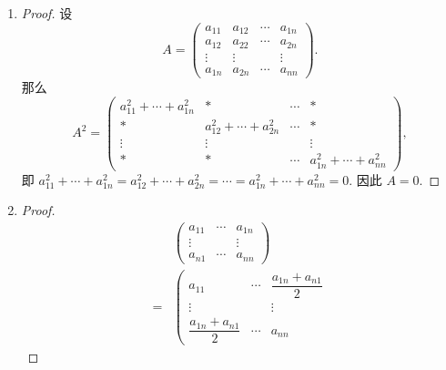\documentclass[a4paper, 11pt]{ctexart}
\begin{document}
\begin{enumerate}
    \item %
        \begin{proof}
            设
            \[
                A =
                \left(
                    \begin{array}{cccc}
                        a_{11} & a_{12} & \cdots & a_{1n} \\
                        a_{12} & a_{22} & \cdots & a_{2n} \\
                        \vdots & \vdots &  & \vdots \\
                        a_{1n} & a_{2n} & \cdots & a_{nn}
                    \end{array}
                \right).    
            \]
            那么
            \[
                A^2 =
                \left(
                    \begin{array}{cccc}
                        a_{11}^2 + \cdots + a_{1n}^2 & * & \cdots & * \\
                        * & a_{12}^2 + \cdots + a_{2n}^2 & \cdots & * \\
                        \vdots & \vdots &  & \vdots \\
                        * & * & \cdots & a_{1n}^2 + \cdots + a_{nn}^2
                    \end{array}
                \right),
            \]
            即 $a_{11}^2 + \cdots + a_{1n}^2 = a_{12}^2 + \cdots + a_{2n}^2 = \cdots = a_{1n}^2 + \cdots + a_{nn}^2 = 0$. 因此 $A = 0$.
        \end{proof}
    \item %
        \begin{proof}
            \begin{align*}
                & \left(
                    \begin{array}{cccc}
                        a_{11} & \cdots & a_{1n} \\
                        \vdots &  & \vdots \\
                        a_{n1} & \cdots & a_{nn}
                    \end{array}
                \right) \\
                ={} &
                \left(
                    \begin{array}{cccc}
                        a_{11} & \cdots & \dfrac{a_{1n}+a_{n1}}{2} \\
                        \vdots &  & \vdots \\
                        \dfrac{a_{1n}+a_{n1}}{2} & \cdots & a_{nn}

\end{array}
\end{align*}
\end{proof}
\end{enumerate}
\end{document}
